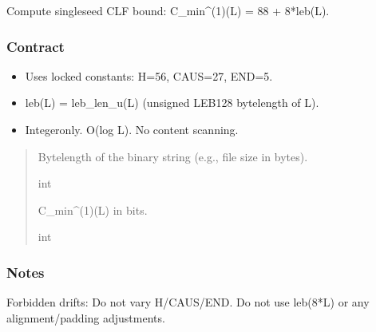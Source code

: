 \documentclass[letterpaper,10pt,english]{sphinxmanual}
\begin{document}
\begin{fulllineitems}
\label{\detokenize{api_reference:clf_calculator.clf_single_seed_cost}}
\pysigstartsignatures
\pysiglinewithargsret
{}
{}
{}
\pysigstopsignatures
\sphinxAtStartPar
Compute single\sphinxhyphen{}seed CLF bound: C\_min\textasciicircum{}(1)(L) = 88 + 8*leb(L).


\subsubsection{Contract}
\label{\detokenize{api_reference:contract}}\begin{itemize}
\item {} 
\sphinxAtStartPar
Uses locked constants: H=56, CAUS=27, END=5.

\item {} 
\sphinxAtStartPar
leb(L) = leb\_len\_u(L) (unsigned LEB128 byte\sphinxhyphen{}length of L).

\item {} 
\sphinxAtStartPar
Integer\sphinxhyphen{}only. O(log L). No content scanning.

\end{itemize}
\begin{quote}\begin{description}
\sphinxAtStartPar
{}

\sphinxAtStartPar
Byte\sphinxhyphen{}length of the binary string (e.g., file size in bytes).

\sphinxAtStartPar
int

\sphinxAtStartPar
C\_min\textasciicircum{}(1)(L) in bits.

\sphinxAtStartPar
int

\end{description}\end{quote}
\subsubsection*{Notes}

\sphinxAtStartPar
Forbidden drifts:
\sphinxhyphen{} Do not vary H/CAUS/END.
\sphinxhyphen{} Do not use leb(8*L) or any alignment/padding adjustments.

\end{fulllineitems}
\end{document}
